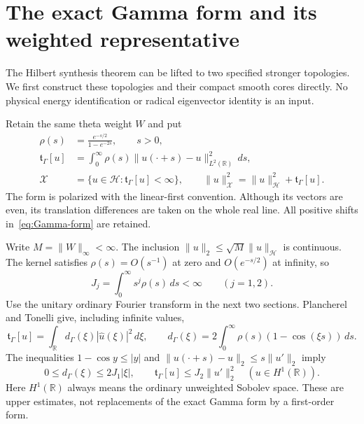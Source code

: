 \documentclass[11pt,a4paper]{article}
\numberwithin{equation}{section}
\theoremstyle{definition}
\theoremstyle{remark}
\newcommand{\R}{\mathbb R}
\newcommand{\Hh}{\mathcal H}
\newcommand{\norm}[1]{\lVert #1\rVert}
\begin{document}
\section{The exact Gamma form and its weighted representative}\label{sec:Gamma-form}

The Hilbert synthesis theorem can be lifted to two specified stronger topologies. We first construct these topologies and their compact smooth cores directly. No physical energy identification or radical eigenvector identity is an input.

Retain the same theta weight $W$ and put
\begin{align}
 \rho(s)&=\frac{e^{-s/2}}{1-e^{-2s}},\qquad s>0,\label{eq:Gamma-rho}\\
 \mathfrak t_\Gamma[u]&=\int_0^\infty\rho(s)
       \norm{u(\cdot+s)-u}_{L^2(\R)}^2\,ds,\label{eq:Gamma-form}\\
 \mathcal X&=\{u\in\Hh:\mathfrak t_\Gamma[u]<\infty\},\qquad
 \norm{u}_{\mathcal X}^2=\norm{u}_{\Hh}^2+\mathfrak t_\Gamma[u].
 \label{eq:Gamma-X}
\end{align}
The form is polarized with the linear-first convention. Although its vectors are even, its translation differences are taken on the whole real line. All positive shifts in~\eqref{eq:Gamma-form} are retained.

Write $M=\norm{W}_\infty<\infty$. The inclusion
$\norm{u}_2\le\sqrt M\norm{u}_{\Hh}$ is continuous. The kernel satisfies $\rho(s)=O(s^{-1})$ at zero and $O(e^{-s/2})$ at infinity, so
\begin{equation}\label{eq:Gamma-J}
 J_j=\int_0^\infty s^j\rho(s)\,ds<\infty\qquad(j=1,2).
\end{equation}
Use the unitary ordinary Fourier transform in the next two sections. Plancherel and Tonelli give, including infinite values,
\begin{equation}\label{eq:Gamma-multiplier}
 \mathfrak t_\Gamma[u]=\int_\R d_\Gamma(\xi)|\widehat u(\xi)|^2\,d\xi,
 \qquad d_\Gamma(\xi)=2\int_0^\infty\rho(s)(1-\cos(\xi s))\,ds.
\end{equation}
The inequalities $1-\cos y\le |y|$ and
$\norm{u(\cdot+s)-u}_2\le s\norm{u'}_2$ imply
\begin{equation}\label{eq:Gamma-first-order}
 0\le d_\Gamma(\xi)\le2J_1|\xi|,\qquad
 \mathfrak t_\Gamma[u]\le J_2\norm{u'}_2^2
 \quad(u\in H^1(\R)).
\end{equation}
Here $H^1(\R)$ always means the ordinary unweighted Sobolev space. These are upper estimates, not replacements of the exact Gamma form by a first-order form.
\end{document}
